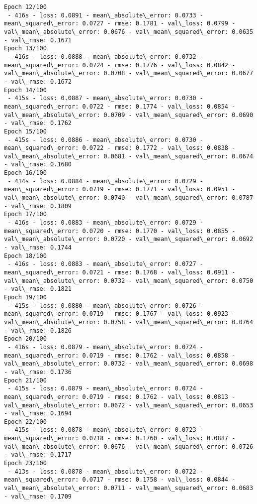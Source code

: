 \documentclass[11pt]{article}
\begin{document}
\begin{Verbatim}[commandchars=\\\{\}]
Epoch 12/100
 - 416s - loss: 0.0891 - mean\_absolute\_error: 0.0733 - mean\_squared\_error: 0.0727 - rmse: 0.1781 - val\_loss: 0.0799 - val\_mean\_absolute\_error: 0.0676 - val\_mean\_squared\_error: 0.0635 - val\_rmse: 0.1671
Epoch 13/100
 - 416s - loss: 0.0888 - mean\_absolute\_error: 0.0732 - mean\_squared\_error: 0.0724 - rmse: 0.1776 - val\_loss: 0.0842 - val\_mean\_absolute\_error: 0.0708 - val\_mean\_squared\_error: 0.0677 - val\_rmse: 0.1672
Epoch 14/100
 - 415s - loss: 0.0887 - mean\_absolute\_error: 0.0730 - mean\_squared\_error: 0.0722 - rmse: 0.1774 - val\_loss: 0.0854 - val\_mean\_absolute\_error: 0.0709 - val\_mean\_squared\_error: 0.0690 - val\_rmse: 0.1762
Epoch 15/100
 - 415s - loss: 0.0886 - mean\_absolute\_error: 0.0730 - mean\_squared\_error: 0.0722 - rmse: 0.1772 - val\_loss: 0.0838 - val\_mean\_absolute\_error: 0.0681 - val\_mean\_squared\_error: 0.0674 - val\_rmse: 0.1680
Epoch 16/100
 - 414s - loss: 0.0884 - mean\_absolute\_error: 0.0729 - mean\_squared\_error: 0.0719 - rmse: 0.1771 - val\_loss: 0.0951 - val\_mean\_absolute\_error: 0.0740 - val\_mean\_squared\_error: 0.0787 - val\_rmse: 0.1809
Epoch 17/100
 - 416s - loss: 0.0883 - mean\_absolute\_error: 0.0729 - mean\_squared\_error: 0.0720 - rmse: 0.1770 - val\_loss: 0.0855 - val\_mean\_absolute\_error: 0.0720 - val\_mean\_squared\_error: 0.0692 - val\_rmse: 0.1744
Epoch 18/100
 - 416s - loss: 0.0883 - mean\_absolute\_error: 0.0727 - mean\_squared\_error: 0.0721 - rmse: 0.1768 - val\_loss: 0.0911 - val\_mean\_absolute\_error: 0.0732 - val\_mean\_squared\_error: 0.0750 - val\_rmse: 0.1821
Epoch 19/100
 - 415s - loss: 0.0880 - mean\_absolute\_error: 0.0726 - mean\_squared\_error: 0.0719 - rmse: 0.1767 - val\_loss: 0.0923 - val\_mean\_absolute\_error: 0.0758 - val\_mean\_squared\_error: 0.0764 - val\_rmse: 0.1826
Epoch 20/100
 - 416s - loss: 0.0879 - mean\_absolute\_error: 0.0724 - mean\_squared\_error: 0.0719 - rmse: 0.1762 - val\_loss: 0.0858 - val\_mean\_absolute\_error: 0.0732 - val\_mean\_squared\_error: 0.0698 - val\_rmse: 0.1736
Epoch 21/100
 - 415s - loss: 0.0879 - mean\_absolute\_error: 0.0724 - mean\_squared\_error: 0.0719 - rmse: 0.1762 - val\_loss: 0.0813 - val\_mean\_absolute\_error: 0.0672 - val\_mean\_squared\_error: 0.0653 - val\_rmse: 0.1694
Epoch 22/100
 - 415s - loss: 0.0878 - mean\_absolute\_error: 0.0723 - mean\_squared\_error: 0.0718 - rmse: 0.1760 - val\_loss: 0.0887 - val\_mean\_absolute\_error: 0.0676 - val\_mean\_squared\_error: 0.0726 - val\_rmse: 0.1717
Epoch 23/100
 - 413s - loss: 0.0878 - mean\_absolute\_error: 0.0722 - mean\_squared\_error: 0.0717 - rmse: 0.1758 - val\_loss: 0.0844 - val\_mean\_absolute\_error: 0.0711 - val\_mean\_squared\_error: 0.0683 - val\_rmse: 0.1709

\end{Verbatim}
\end{document}
